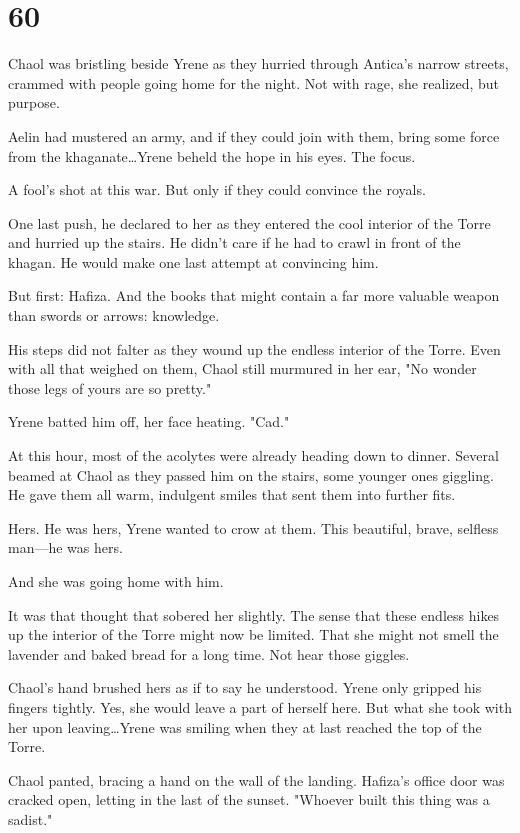 
\chapter{60}

Chaol was bristling beside Yrene as they hurried through Antica's narrow streets, crammed with people going home for the night.
Not with rage, she realized, but purpose.

Aelin had mustered an army, and if they could join with them, bring some force from the khaganate\ldots Yrene beheld the hope in his eyes.
The focus.

A fool's shot at this war.
But only if they could convince the royals.

One last push, he declared to her as they entered the cool interior of the Torre and hurried up the stairs.
He didn't care if he had to crawl in front of the khagan.
He would make one last attempt at convincing him.

But first: Hafiza.
And the books that might contain a far more valuable weapon than swords or arrows: knowledge.

His steps did not falter as they wound up the endless interior of the Torre.
Even with all that weighed on them, Chaol still murmured in her ear, "No wonder those legs of yours are so pretty."

Yrene batted him off, her face heating.
"Cad."

At this hour, most of the acolytes were already heading down to dinner.
Several beamed at Chaol as they passed him on the stairs, some younger ones giggling.
He gave them all warm, indulgent smiles that sent them into further fits.

Hers.
He was hers, Yrene wanted to crow at them.
This beautiful, brave, selfless man---he was hers.

And she was going home with him.

It was that thought that sobered her slightly.
The sense that these endless hikes up the interior of the Torre might now be limited.
That she might not smell the lavender and baked bread for a long time.
Not hear those giggles.

Chaol's hand brushed hers as if to say he understood.
Yrene only gripped his fingers tightly.
Yes, she would leave a part of herself here.
But what she took with her upon leaving\ldots Yrene was smiling when they at last reached the top of the Torre.

Chaol panted, bracing a hand on the wall of the landing.
Hafiza's office door was cracked open, letting in the last of the sunset.
"Whoever built this thing was a sadist."

